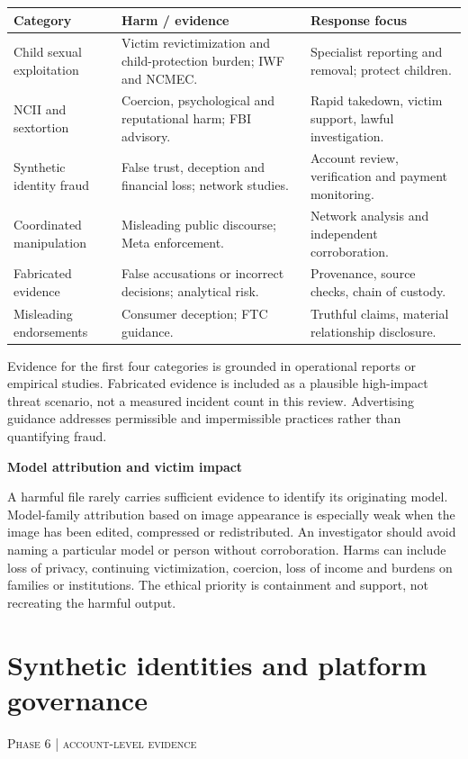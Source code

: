 \documentclass[10pt,a4paper]{article}
\newcommand{\sect}[2]{\Needspace{6\baselineskip}\section{#1}\textcolor{muted}{\small\textsc{#2}}\par\vspace{2mm}}
\newcommand{\sub}[1]{\vspace{1mm}\textbf{#1}\par}
\begin{document}
\begin{center}\small\begin{tabularx}{\linewidth}{@{}YYY@{}}\toprule
\textbf{Category} & \textbf{Harm / evidence} & \textbf{Response focus}\\\midrule
Child sexual exploitation & Victim revictimization and child-protection burden; IWF and NCMEC. & Specialist reporting and removal; protect children.\\
NCII and sextortion & Coercion, psychological and reputational harm; FBI advisory. & Rapid takedown, victim support, lawful investigation.\\
Synthetic identity fraud & False trust, deception and financial loss; network studies. & Account review, verification and payment monitoring.\\
Coordinated manipulation & Misleading public discourse; Meta enforcement. & Network analysis and independent corroboration.\\
Fabricated evidence & False accusations or incorrect decisions; analytical risk. & Provenance, source checks, chain of custody.\\
Misleading endorsements & Consumer deception; FTC guidance. & Truthful claims, material relationship disclosure.\\\bottomrule\end{tabularx}\end{center}

Evidence for the first four categories is grounded in operational reports or empirical studies. Fabricated evidence is included as a plausible high-impact threat scenario, not a measured incident count in this review. Advertising guidance addresses permissible and impermissible practices rather than quantifying fraud. \cite{iwf,ncmec25,fbi,meta,fakefaces,ftcads}


\sub{Model attribution and victim impact}

A harmful file rarely carries sufficient evidence to identify its originating model. Model-family attribution based on image appearance is especially weak when the image has been edited, compressed or redistributed. An investigator should avoid naming a particular model or person without corroboration. Harms can include loss of privacy, continuing victimization, coercion, loss of income and burdens on families or institutions. The ethical priority is containment and support, not recreating the harmful output.



\sect{Synthetic identities and platform governance}{Phase 6 | account-level evidence}
\end{document}
